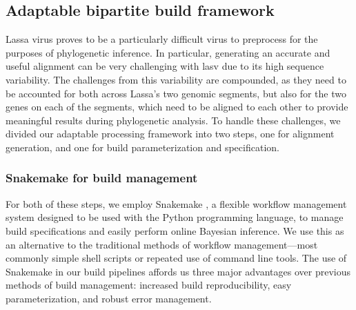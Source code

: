 \subsection{Adaptable bipartite build framework}

Lassa virus proves to be a particularly difficult virus to preprocess for the purposes of phylogenetic inference.
In particular, generating an accurate and useful alignment can be very challenging with \gls{lasv} due to its high sequence variability.
The challenges from this variability are compounded, as they need to be accounted for both across Lassa's two genomic segments, but also for the two genes on each of the segments, which need to be aligned to each other to provide meaningful results during phylogenetic analysis.
To handle these challenges, we divided our adaptable processing framework into two steps, one for alignment generation, and one for build parameterization and specification.

\subsubsection{Snakemake for build management}

For both of these steps, we employ Snakemake \cite{koster2012snakemake}, a flexible workflow management system designed to be used with the Python programming language, to manage build specifications and easily perform online Bayesian inference.
We use this as an alternative to the traditional methods of workflow management---most commonly simple shell scripts or repeated use of command line tools.
The use of Snakemake in our build pipelines affords us three major advantages over previous methods of build management: increased build reproducibility, easy parameterization, and robust error management.

